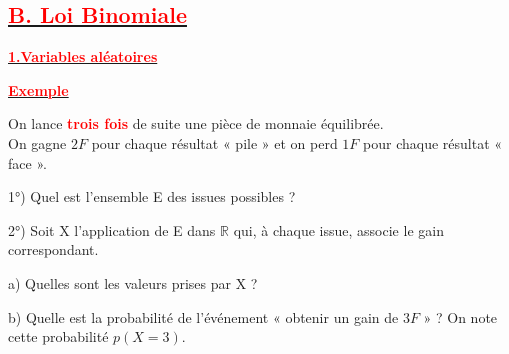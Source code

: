 \documentclass[12pt]{article}
\begin{document}

	
    
    
    
    
    
    
    
\subsection*{\underline{\textbf{\textcolor{red}{B. Loi Binomiale}}}}
\underline{\textbf{\textcolor{red}{1.Variables aléatoires}}}

\underline{\textbf{\textcolor{red}{Exemple}}}

On lance \textbf{\textcolor{red}{trois fois}} de suite une pièce de monnaie équilibrée.\\ On gagne $2{F}$ pour chaque résultat « pile » et on perd $1{F}$ pour chaque résultat « face ».

1°) Quel est l’ensemble E des issues possibles ?

2°) Soit X l’application de E dans $\mathbb{R}$ qui, à chaque issue, associe le gain correspondant.

	a) Quelles sont les valeurs prises par X ?

	b) Quelle est la probabilité de l’événement « obtenir un gain de ${3F}$ » ? On note cette probabilité $p(X = 3)$.
	
\end{document}
